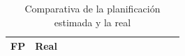 \documentclass{subfiles}
\begin{document}
\begin{table}[ht]
\begin{tabular}{|cc|ccc|ccccccccc|}
\multicolumn{1}{|c|}{\multirow{-2}{*}{FP}} & Real & \multicolumn{1}{c|}{} & \multicolumn{1}{c|}{} &  & \multicolumn{1}{c|}{} & \multicolumn{1}{c|}{} & \multicolumn{1}{c|}{} & \multicolumn{1}{c|}{} & \multicolumn{1}{c|}{} & \multicolumn{1}{c|}{\cellcolor[HTML]{C0C0C0}} & \multicolumn{1}{c|}{\cellcolor[HTML]{C0C0C0}} & \multicolumn{1}{c|}{\cellcolor[HTML]{C0C0C0}} & \cellcolor[HTML]{C0C0C0} \\ \hline
\end{tabular}
\caption{Comparativa de la planificación estimada y la real}
\label{tab:comparativa_de_la_planificacion_estimada_y_la_real}
\end{table}
\end{document}

